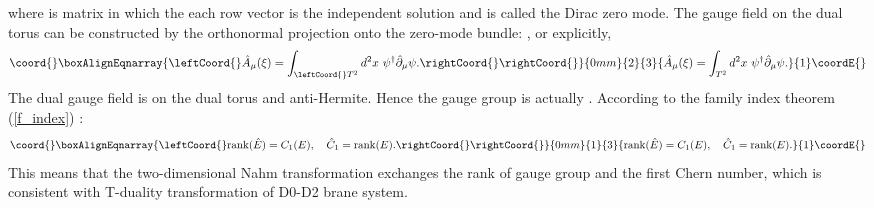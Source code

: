 \documentclass[a4paper,epsf,12pt]{article}
\providecommand{\Ah}{\hat{A}}
\providecommand{\Ch}{\hat{C}}
\providecommand{\Dh}{\hat{D}}
\providecommand{\delh}{\hat{\partial}}
\def \rank{\mathrm{rank}}
\def \Eh{\hat{E}}
\begin{document}
where \coordHE{} is \coordHE{} matrix 
in which the each row vector \coordHE{}
is the independent solution and is called the Dirac zero mode.
The gauge field on the dual torus can be constructed by
the orthonormal projection onto the zero-mode bundle:
\myHighlight{$
\Dh_\mu= P \delh_\mu=(\psi\psi^\dagger)\delh_\mu
$}\coordHE{}, or explicitly,
\begin{eqnarray}\coord{}\boxAlignEqnarray{\leftCoord{}
\label{gauge_02}
\Ah_\mu(\xi) = \int_{\leftCoord{}T^2}d^2x~ \psi^\dagger\delh_\mu\psi. \rightCoord{}
\rightCoord{}}{0mm}{2}{3}{
\Ah_\mu(\xi) = \int_{T^2}d^2x~ \psi^\dagger\delh_\mu\psi. 
}{1}\coordE{}\end{eqnarray}
The dual gauge field is on the dual torus and anti-Hermite.
Hence the gauge group is actually \coordHE{}.
According to the family index theorem (\ref{f_index}) :
\begin{eqnarray*}\coord{}\boxAlignEqnarray{\leftCoord{}
\rank(\Eh)=C_1(E),~~~\Ch_1=\rank(E).\rightCoord{}
\rightCoord{}}{0mm}{1}{3}{
\rank(\Eh)=C_1(E),~~~\Ch_1=\rank(E).
}{1}\coordE{}\end{eqnarray*}
This means that
the two-dimensional Nahm transformation
exchanges the rank of gauge group and the first Chern number,
which is consistent with T-duality transformation of D0-D2
brane system.

\vspace{2mm}
\end{document}
